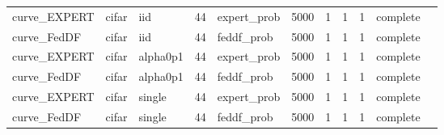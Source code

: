\begin{tabular}{lllrlrrrrll}
curve\_EXPERT & cifar & iid & 44 & expert\_prob & 5000 & 1 & 1 & 1 & complete &  \\
curve\_FedDF & cifar & iid & 44 & feddf\_prob & 5000 & 1 & 1 & 1 & complete &  \\
curve\_EXPERT & cifar & alpha0p1 & 44 & expert\_prob & 5000 & 1 & 1 & 1 & complete &  \\
curve\_FedDF & cifar & alpha0p1 & 44 & feddf\_prob & 5000 & 1 & 1 & 1 & complete &  \\
curve\_EXPERT & cifar & single & 44 & expert\_prob & 5000 & 1 & 1 & 1 & complete &  \\
curve\_FedDF & cifar & single & 44 & feddf\_prob & 5000 & 1 & 1 & 1 & complete &  \\
\bottomrule
\end{tabular}
